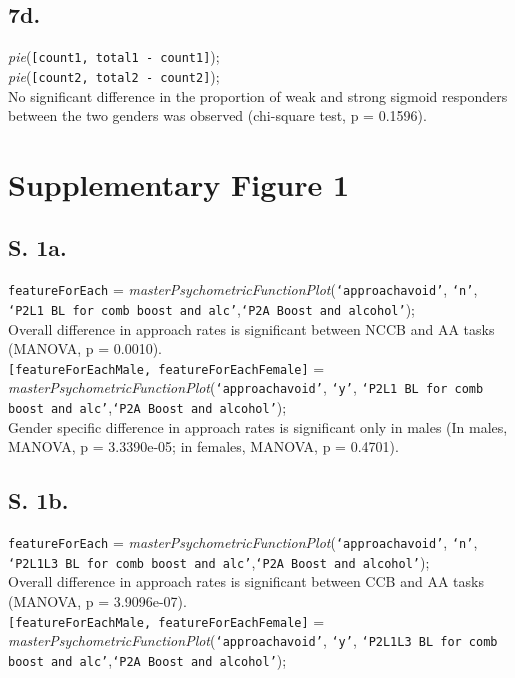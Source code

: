 \documentclass{article}
\begin{document}
\subsection{7d.}
\emph{pie}(\texttt{[count1, total1 - count1]});\\
\emph{pie}(\texttt{[count2, total2 - count2]});\\

No significant difference in the proportion of weak and strong sigmoid responders between the two genders was observed (chi-square test, p = 0.1596).


\section{Supplementary Figure 1}
\subsection{S. 1a.}
\texttt{featureForEach} = \emph{masterPsychometricFunctionPlot}(\texttt{`approachavoid'}, \texttt{`n'}, \texttt{`P2L1 BL for comb boost and alc'},\texttt{`P2A Boost and alcohol'});\\

Overall difference in approach rates is significant between NCCB and AA tasks (MANOVA, p = 0.0010).\\

\texttt{[featureForEachMale, featureForEachFemale]} = \emph{masterPsychometricFunctionPlot}(\texttt{`approachavoid'}, \texttt{`y'}, \texttt{`P2L1 BL for comb boost and alc'},\texttt{`P2A Boost and alcohol'});\\

Gender specific difference in approach rates is significant only in males (In males, MANOVA, p = 3.3390e-05; in females, MANOVA, p = 0.4701).

\subsection{S. 1b.}
\texttt{featureForEach} = \emph{masterPsychometricFunctionPlot}(\texttt{`approachavoid'}, \texttt{`n'}, \texttt{`P2L1L3 BL for comb boost and alc'},\texttt{`P2A Boost and alcohol'});\\

Overall difference in approach rates is significant between CCB and AA tasks (MANOVA, p = 3.9096e-07).\\

\texttt{[featureForEachMale, featureForEachFemale]} = \emph{masterPsychometricFunctionPlot}(\texttt{`approachavoid'}, \texttt{`y'}, \texttt{`P2L1L3 BL for comb boost and alc'},\texttt{`P2A Boost and alcohol'});\\
\end{document}
